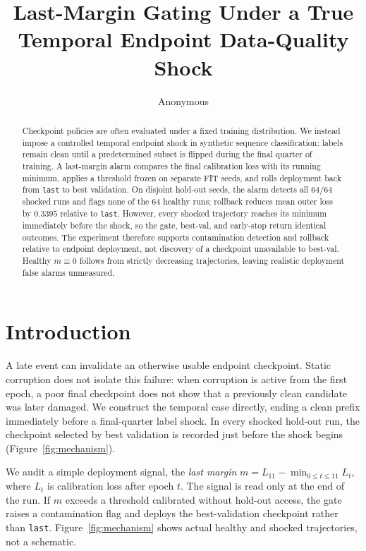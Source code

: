 \documentclass{article} %
\title{Last-Margin Gating Under a True Temporal Endpoint Data-Quality Shock}
\author{Anonymous}
\theoremstyle{remark}
\begin{document}
\maketitle

\begin{abstract}
Checkpoint policies are often evaluated under a fixed training distribution. We instead impose a
controlled temporal endpoint shock in synthetic sequence classification: labels remain clean until
a predetermined subset is flipped during the final quarter of training. A last-margin alarm compares
the final calibration loss with its running minimum, applies a threshold frozen on separate FIT
seeds, and rolls deployment back from \texttt{last} to best validation. On disjoint hold-out seeds,
the alarm detects all $64/64$ shocked runs and flags none of the $64$ healthy runs; rollback reduces
mean outer loss by $0.3395$ relative to \texttt{last}. However, every shocked trajectory reaches its
minimum immediately before the shock, so the gate, best-val, and early-stop return identical
outcomes. The experiment therefore supports contamination detection and rollback relative to
endpoint deployment, not discovery of a checkpoint unavailable to best-val. Healthy
$m\equiv0$ follows from strictly decreasing trajectories, leaving realistic deployment false alarms
unmeasured.
\end{abstract}

\section{Introduction}
\label{sec:intro}

A late event can invalidate an otherwise usable endpoint checkpoint. Static corruption does not
isolate this failure: when corruption is active from the first epoch, a poor final checkpoint does
not show that a previously clean candidate was later damaged. We construct the temporal case
directly, ending a clean prefix immediately before a final-quarter label shock. In every shocked
hold-out run, the checkpoint selected by best validation is recorded just before the shock begins
(Figure~\ref{fig:mechanism}).

We audit a simple deployment signal, the \emph{last margin}
$m=L_{11}-\min_{0\leq t\leq11}L_t$, where $L_t$ is calibration loss after epoch $t$. The signal is
read only at the end of the run. If $m$ exceeds a threshold calibrated without hold-out access, the
gate raises a contamination flag and deploys the best-validation checkpoint rather than
\texttt{last}. Figure~\ref{fig:mechanism} shows actual healthy and shocked trajectories, not a
schematic.
\end{document}
